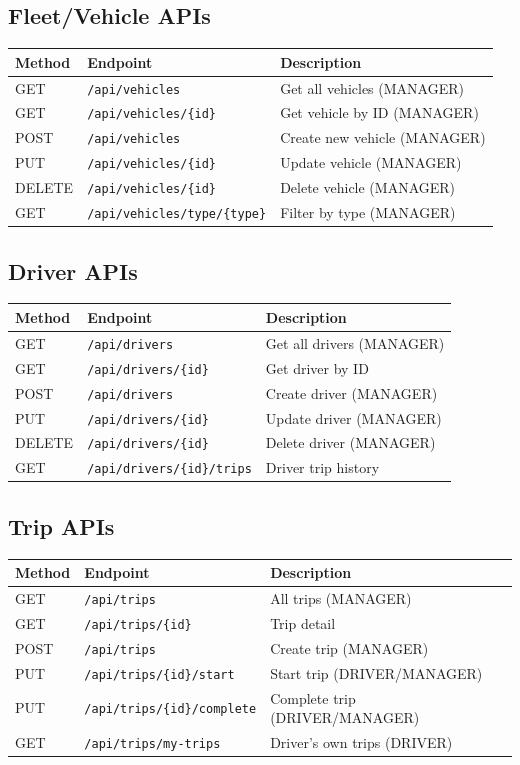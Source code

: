 \documentclass[12pt,a4paper]{report}
\newcommand{\apipath}[1]{\texttt{\textcolor{dangerred}{#1}}}
\begin{document}
\subsection{Fleet/Vehicle APIs}
\begin{tabularx}{\textwidth}{@{}llX@{}}
\toprule
\textbf{Method} & \textbf{Endpoint} & \textbf{Description} \\
\midrule
GET & \apipath{/api/vehicles} & Get all vehicles (MANAGER) \\
GET & \apipath{/api/vehicles/\{id\}} & Get vehicle by ID (MANAGER) \\
POST & \apipath{/api/vehicles} & Create new vehicle (MANAGER) \\
PUT & \apipath{/api/vehicles/\{id\}} & Update vehicle (MANAGER) \\
DELETE & \apipath{/api/vehicles/\{id\}} & Delete vehicle (MANAGER) \\
GET & \apipath{/api/vehicles/type/\{type\}} & Filter by type (MANAGER) \\
\bottomrule
\end{tabularx}

\subsection{Driver APIs}
\begin{tabularx}{\textwidth}{@{}llX@{}}
\toprule
\textbf{Method} & \textbf{Endpoint} & \textbf{Description} \\
\midrule
GET & \apipath{/api/drivers} & Get all drivers (MANAGER) \\
GET & \apipath{/api/drivers/\{id\}} & Get driver by ID \\
POST & \apipath{/api/drivers} & Create driver (MANAGER) \\
PUT & \apipath{/api/drivers/\{id\}} & Update driver (MANAGER) \\
DELETE & \apipath{/api/drivers/\{id\}} & Delete driver (MANAGER) \\
GET & \apipath{/api/drivers/\{id\}/trips} & Driver trip history \\
\bottomrule
\end{tabularx}

\subsection{Trip APIs}
\begin{tabularx}{\textwidth}{@{}llX@{}}
\toprule
\textbf{Method} & \textbf{Endpoint} & \textbf{Description} \\
\midrule
GET & \apipath{/api/trips} & All trips (MANAGER) \\
GET & \apipath{/api/trips/\{id\}} & Trip detail \\
POST & \apipath{/api/trips} & Create trip (MANAGER) \\
PUT & \apipath{/api/trips/\{id\}/start} & Start trip (DRIVER/MANAGER) \\
PUT & \apipath{/api/trips/\{id\}/complete} & Complete trip (DRIVER/MANAGER) \\
GET & \apipath{/api/trips/my-trips} & Driver's own trips (DRIVER) \\
\bottomrule
\end{tabularx}
\end{document}
